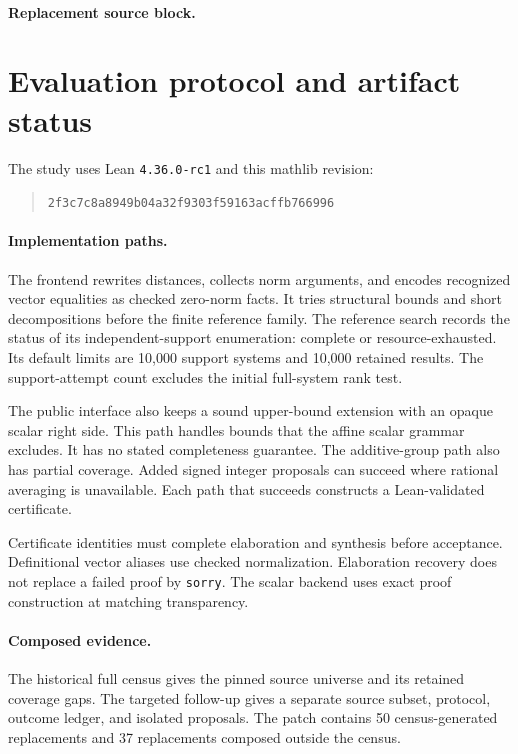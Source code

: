 \paragraph{Replacement source block.}

\section{Evaluation protocol and artifact status}\label{app:evaluation}
The study uses Lean \texttt{4.36.0-rc1} and this mathlib revision:
\begin{quote}\small\texttt{2f3c7c8a8949b04a32f9303f59163acffb766996}\end{quote}

\paragraph{Implementation paths.}
The frontend rewrites distances, collects norm arguments, and encodes recognized vector equalities as checked zero-norm facts.
It tries structural bounds and short decompositions before the finite reference family.
The reference search records the status of its independent-support enumeration: complete or resource-exhausted.
Its default limits are 10,000 support systems and 10,000 retained results.
The support-attempt count excludes the initial full-system rank test.

The public interface also keeps a sound upper-bound extension with an opaque scalar right side.
This path handles bounds that the affine scalar grammar excludes.
It has no stated completeness guarantee.
The additive-group path also has partial coverage.
Added signed integer proposals can succeed where rational averaging is unavailable.
Each path that succeeds constructs a Lean-validated certificate.

Certificate identities must complete elaboration and synthesis before acceptance.
Definitional vector aliases use checked normalization.
Elaboration recovery does not replace a failed proof by \texttt{sorry}.
The scalar backend uses exact proof construction at matching transparency.

\paragraph{Composed evidence.}
The historical full census gives the pinned source universe and its retained coverage gaps.
The targeted follow-up gives a separate source subset, protocol, outcome ledger, and isolated proposals.
The patch contains 50 census-generated replacements and 37 replacements composed outside the census.

